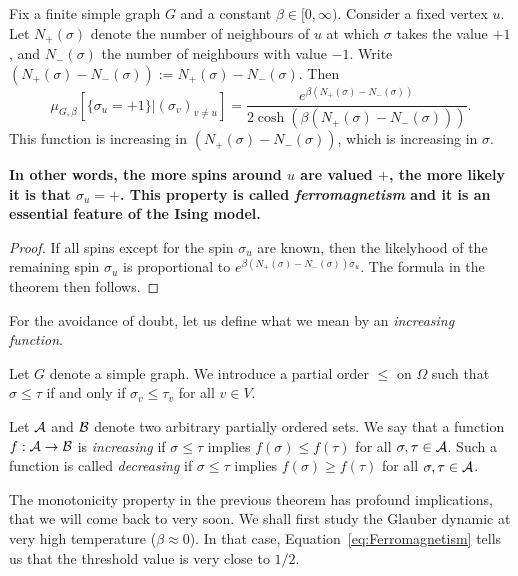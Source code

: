 \begin{theorem}[Ferromagnetism]
    \label{thm:Ferromagnetism}
    Fix a finite simple graph $G$ and a constant $\beta\in[0,\infty)$.
    Consider a fixed vertex $u$.
    Let $N_+(\sigma)$ denote the number of neighbours of $u$
    at which $\sigma$ takes the value $+1$,
    and $N_-(\sigma)$ the number of neighbours with value $-1$.
    Write $(N_+(\sigma)-N_-(\sigma)):=N_+(\sigma)-N_-(\sigma)$.
    Then
    \begin{equation}
        \label{eq:Ferromagnetism}
        \mu_{G,\beta}[\{\sigma_u=+1\}|(\sigma_v)_{v\neq u}]
        =
        \frac{e^{\beta (N_+(\sigma)-N_-(\sigma))}}{2\cosh (\beta (N_+(\sigma)-N_-(\sigma)))}.
    \end{equation}
    This function is increasing in $(N_+(\sigma)-N_-(\sigma))$, which is increasing in $\sigma$.

    \textbf{In other words, the more spins around $u$ are valued $+$,
        the more likely it is that $\sigma_u=+$. This property is called \emph{ferromagnetism}
    and it is an essential feature of the Ising model.}
\end{theorem}

\begin{proof}
    If all spins except for the spin $\sigma_u$ are known,
    then the likelyhood of the remaining spin $\sigma_u$ is proportional to
    $e^{\beta(N_+(\sigma)-N_-(\sigma))\sigma_u}$.
    The formula in the theorem then follows.
\end{proof}

For the avoidance of doubt, let us define what we mean by an \emph{increasing function}.

\begin{definition}
    Let $G$ denote a simple graph.
    We introduce a partial order $\leq$ on $\Omega$ such that
    $\sigma\leq\tau$ if and only if $\sigma_v\leq\tau_v$ for all $v\in V$.

    Let $\mathcal A$ and $\mathcal B$ denote two arbitrary partially ordered sets.
    We say that a function $f:\mathcal A\to\mathcal B$ is \emph{increasing} if $\sigma\leq\tau$
    implies $f(\sigma)\leq f(\tau)$ for all $\sigma,\tau\in\mathcal A$.
    Such a  function is called \emph{decreasing} if $\sigma\leq\tau$ implies
    $f(\sigma)\geq f(\tau)$ for all $\sigma,\tau\in\mathcal A$.
\end{definition}

The monotonicity property in the previous theorem has profound implications,
that we will come back to very soon.
We shall first study the Glauber dynamic at very high temperature ($\beta\approx0$).
In that case, Equation~\eqref{eq:Ferromagnetism} tells us that the threshold value is
very close to $1/2$.

